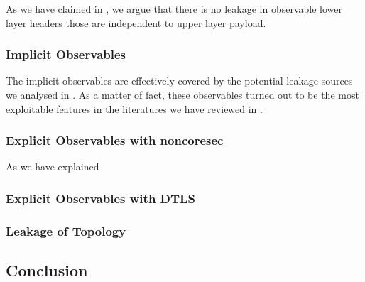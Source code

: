As we have claimed in , we argue that there is no leakage in observable lower layer headers those are independent to upper layer payload.

\subsubsection{Implicit Observables}

The implicit observables are effectively covered by the potential leakage sources we analysed in . As a matter of fact, these observables turned out to be the most exploitable features in the literatures we have reviewed in .

\subsubsection{Explicit Observables with noncoresec}

As we have explained 

\subsubsection{Explicit Observables with DTLS}

\subsubsection{Leakage of Topology}

\subsection{Conclusion}